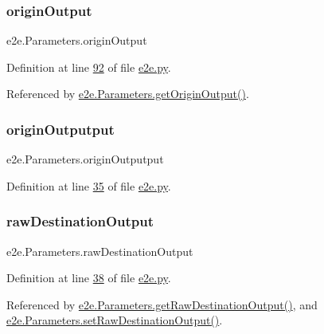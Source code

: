 \subsubsection{\texorpdfstring{origin\+Output}{originOutput}}
{\footnotesize\ttfamily e2e.\+Parameters.\+origin\+Output}



Definition at line \hyperlink{e2e_8py_source_l00092}{92} of file \hyperlink{e2e_8py_source}{e2e.\+py}.



Referenced by \hyperlink{e2e_8py_source_l00094}{e2e.\+Parameters.\+get\+Origin\+Output()}.

\mbox{\label{classe2e_1_1_parameters_acece0ee5caaa6322c3a337c3b7f00599}} 
\subsubsection{\texorpdfstring{origin\+Outputput}{originOutputput}}
{\footnotesize\ttfamily e2e.\+Parameters.\+origin\+Outputput}



Definition at line \hyperlink{e2e_8py_source_l00035}{35} of file \hyperlink{e2e_8py_source}{e2e.\+py}.

\mbox{\label{classe2e_1_1_parameters_a84b319098084ed505e089a600e154f6e}} 
\subsubsection{\texorpdfstring{raw\+Destination\+Output}{rawDestinationOutput}}
{\footnotesize\ttfamily e2e.\+Parameters.\+raw\+Destination\+Output}



Definition at line \hyperlink{e2e_8py_source_l00038}{38} of file \hyperlink{e2e_8py_source}{e2e.\+py}.



Referenced by \hyperlink{e2e_8py_source_l00112}{e2e.\+Parameters.\+get\+Raw\+Destination\+Output()}, and \hyperlink{e2e_8py_source_l00109}{e2e.\+Parameters.\+set\+Raw\+Destination\+Output()}.

